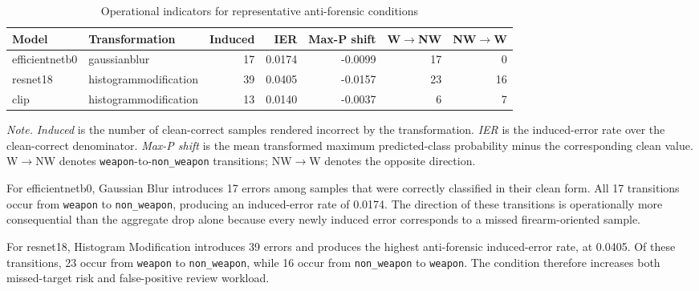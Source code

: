 \begin{table}[H]
\centering
\scriptsize
\setlength{\tabcolsep}{3.5pt}
\renewcommand{\arraystretch}{1.15}
\caption{Operational indicators for representative anti-forensic conditions}
\label{tab:results-antiforensic-operational-errors}
\begin{tabular}{@{}l l r r r r r@{}}
\toprule
\textbf{Model} &
\textbf{Transformation} &
\textbf{Induced} &
\textbf{IER} &
\textbf{Max-P shift} &
\textbf{W\(\rightarrow\)NW} &
\textbf{NW\(\rightarrow\)W} \\
\midrule

\gls{efficientnetb0}
& \gls{gaussianblur}
& 17
& 0.0174
& -0.0099
& 17
& 0 \\

\gls{resnet18}
& \gls{histogrammodification}
& 39
& 0.0405
& -0.0157
& 23
& 16 \\

\acrshort{clip}
& \gls{histogrammodification}
& 13
& 0.0140
& -0.0037
& 6
& 7 \\

\bottomrule
\end{tabular}

\vspace{0.4em}
\footnotesize
\textit{Note.} \textit{Induced} is the number of clean-correct samples rendered
incorrect by the transformation. \textit{IER} is the induced-error rate over
the clean-correct denominator. \textit{Max-P shift} is the mean transformed
maximum predicted-class probability minus the corresponding clean value.
W\(\rightarrow\)NW denotes \texttt{weapon}-to-\texttt{non\_weapon}
transitions; NW\(\rightarrow\)W denotes the opposite direction.
\end{table}

For \gls{efficientnetb0}, Gaussian Blur introduces 17 errors among samples that were
correctly classified in their clean form. All 17 transitions occur from
\texttt{weapon} to \texttt{non\_weapon}, producing an induced-error rate of
0.0174. The direction of these transitions is operationally more consequential
than the aggregate drop alone because every newly induced error corresponds to
a missed firearm-oriented sample.

For \gls{resnet18}, Histogram Modification introduces 39 errors and produces the
highest anti-forensic induced-error rate, at 0.0405. Of these transitions, 23
occur from \texttt{weapon} to \texttt{non\_weapon}, while 16 occur from
\texttt{non\_weapon} to \texttt{weapon}. The condition therefore increases
both missed-target risk and false-positive review workload.

